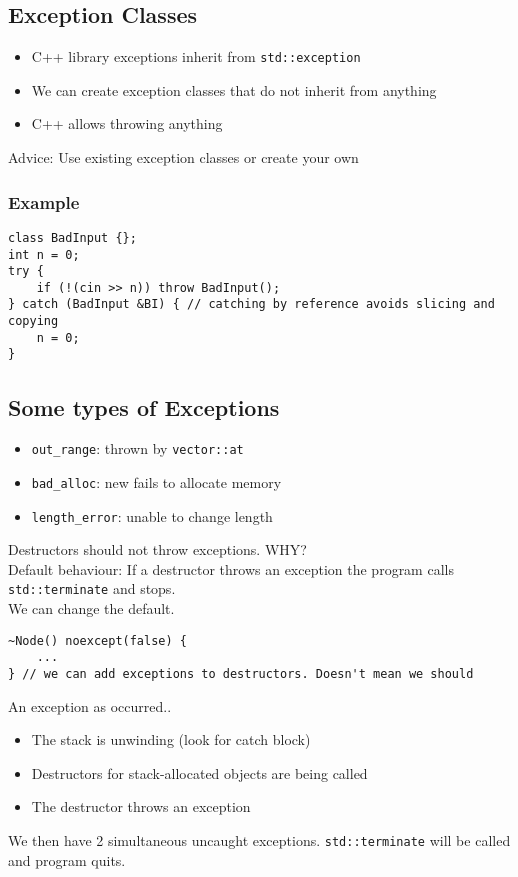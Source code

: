 \documentclass[12pt]{article}
\begin{document}
\subsection{Exception Classes}
\begin{itemize}
    \item C++ library exceptions inherit from \lstinline{std::exception}
    \item We can create exception classes that do not inherit from anything
    \item C++ allows throwing anything
\end{itemize}
Advice: Use existing exception classes or create your own
\subsubsection{Example}
\begin{lstlisting}
class BadInput {};
int n = 0;
try {
    if (!(cin >> n)) throw BadInput();
} catch (BadInput &BI) { // catching by reference avoids slicing and copying
    n = 0;
}
\end{lstlisting}
\subsection{Some types of Exceptions}
\begin{itemize}
    \item \lstinline{out_range}: thrown by \lstinline{vector::at}
    \item \lstinline{bad_alloc}: new fails to allocate memory
    \item \lstinline{length_error}: unable to change length
\end{itemize}
Destructors should not throw exceptions. WHY? \\
Default behaviour: If a destructor throws an exception the program calls \lstinline{std::terminate} and stops.  \\
We can change the default.
\begin{lstlisting}
~Node() noexcept(false) {
    ...
} // we can add exceptions to destructors. Doesn't mean we should 
\end{lstlisting}
An exception as occurred..
\begin{itemize}
    \item The stack is unwinding (look for catch block)
    \item Destructors for stack-allocated objects are being called
    \item The destructor throws an exception
\end{itemize}
We then have 2 simultaneous uncaught exceptions. \lstinline{std::terminate} will be called and program quits.
\end{document}
